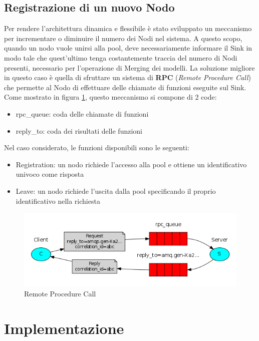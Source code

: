     \subsection{Registrazione di un nuovo Nodo}
      Per rendere l'architettura dinamica e flessibile è stato sviluppato un meccanismo per incrementare o diminuire il numero dei Nodi nel sistema. A questo scopo, quando un nodo vuole unirsi alla pool, deve necessariamente informare il Sink in modo tale che quest'ultimo tenga costantemente traccia del numero di Nodi presenti, necessario per l'operazione di Merging dei modelli. \newline
      La soluzione migliore in questo caso è quella di sfruttare un sistema di \textbf{RPC} (\textit{Remote Procedure Call}) che permette al Nodo di effettuare delle chiamate di funzioni eseguite sul Sink. Come mostrato in figura \ref{fig:RPC}, questo meccanismo si compone di 2 code:
      \begin{itemize}
        \item rpc\_queue: coda delle chiamate di funzioni
        \item reply\_to: coda dei risultati delle funzioni
      \end{itemize}
      Nel caso considerato, le funzioni disponibili sono le seguenti:
      \begin{itemize}
        \item Registration: un nodo richiede l'accesso alla pool e ottiene un identificativo univoco come risposta
        \item Leave: un nodo richiede l'uscita dalla pool specificando il proprio identificativo nella richiesta
      \end{itemize}
      \begin{figure}[h!]
        \centering
        \includegraphics[scale=0.7]{../Immagini/RPC.png}
        \caption{Remote Procedure Call}
        \label{fig:RPC}
      \end{figure}


  \section{Implementazione}
